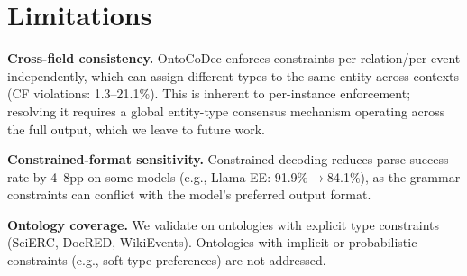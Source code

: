 \documentclass[11pt]{article}
\newcommand{\sys}{OntoCoDec}
\begin{document}
\section*{Limitations}
\label{sec:limitations}

\textbf{Cross-field consistency.}
\sys{} enforces constraints per-relation/per-event independently, which can assign different types to the same entity across contexts (CF violations: 1.3--21.1\%).
This is inherent to per-instance enforcement; resolving it requires a global entity-type consensus mechanism operating across the full output, which we leave to future work.

\textbf{Constrained-format sensitivity.}
Constrained decoding reduces parse success rate by 4--8pp on some models (e.g., Llama EE: 91.9\%$\to$84.1\%), as the grammar constraints can conflict with the model's preferred output format.

\textbf{Ontology coverage.}
We validate on ontologies with explicit type constraints (SciERC, DocRED, WikiEvents).
Ontologies with implicit or probabilistic constraints (e.g., soft type preferences) are not addressed.
\end{document}
